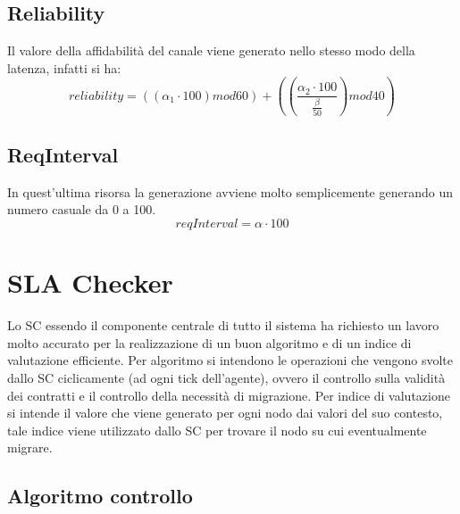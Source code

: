 \subsection{Reliability}
Il valore della affidabilità del canale viene generato nello stesso modo della latenza, infatti si ha:
\begin{equation}
reliability = ((\alpha_{1} \cdot 100)mod60) + \left( \left(\frac{\alpha_{2} \cdot 100}{\frac{\beta}{50}}\right)mod40\right)
\end{equation}
\subsection{ReqInterval}
In quest'ultima risorsa la generazione avviene molto semplicemente generando un numero casuale da 0 a 100.
\begin{equation}
reqInterval = \alpha \cdot 100
\end{equation}
\section{SLA Checker}
Lo SC essendo il componente centrale di tutto il sistema ha richiesto un lavoro molto accurato per la realizzazione di un buon algoritmo e di un indice di valutazione efficiente. Per algoritmo si intendono le operazioni che vengono svolte dallo SC ciclicamente (ad ogni tick dell'agente), ovvero il controllo sulla validità dei contratti e il controllo della necessità di migrazione. Per indice di valutazione si intende il valore che viene generato per ogni nodo dai valori del suo contesto, tale indice viene utilizzato dallo SC per trovare il nodo su cui eventualmente migrare.
\subsection{Algoritmo controllo}

